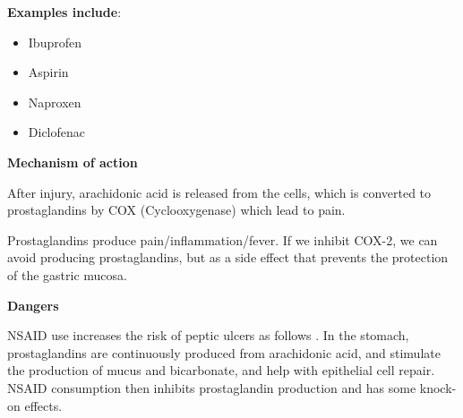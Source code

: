 \textbf{Examples include}:

\begin{itemize}
    \item Ibuprofen
    \item Aspirin
    \item Naproxen
    \item Diclofenac
\end{itemize}

\textbf{Mechanism of action}

After injury, arachidonic acid is released from the cells, which is converted to prostaglandins by COX (Cyclooxygenase) which lead to pain. \cite[10:--]{CobboldPepticUlcerDisease}

Prostaglandins produce pain/inflammation/fever. If we inhibit COX-2, we can avoid producing prostaglandins, but as a side effect that prevents the protection of the gastric mucosa.

\textbf{Dangers}

NSAID use increases the risk of peptic ulcers as follows \cite[11:--]{CobboldPepticUlcerDisease}. In the stomach, prostaglandins are continuously produced from arachidonic acid, and stimulate the production of mucus and bicarbonate, and help with epithelial cell repair. NSAID consumption then inhibits prostaglandin production and has some knock-on effects. 